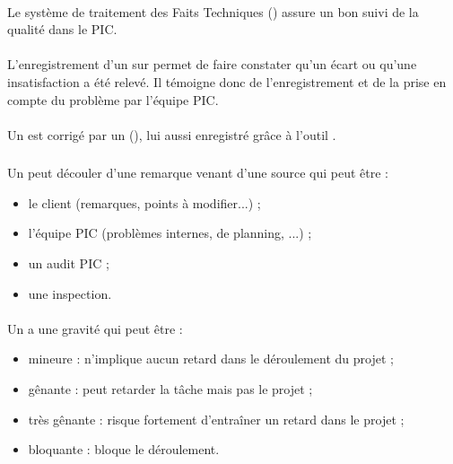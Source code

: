 \paragraph*{} Le système de traitement des Faits Techniques (\FTCourt) assure un bon suivi de la qualité dans
le PIC.

\paragraph*{} L'enregistrement d'un \FT{} sur \lintranet{} permet de faire constater qu'un écart ou
qu'une insatisfaction a été relevé. Il témoigne donc de l'enregistrement et de la prise en compte
du problème par l'équipe PIC.

\paragraph*{} Un \FTCourt{} est corrigé par un \OC{} (\OCCourt), lui aussi enregistré grâce à l'outil
\lintranet .

\subsubsection*{\FT}
\paragraph*{} Un \FT{} peut découler d'une remarque venant d'une source qui peut être :

\begin{itemize}
	\item le client (remarques, points à modifier...) ;
	\item l'équipe PIC (problèmes internes, de planning, ...) ;
	\item un audit PIC ;
	\item une inspection.
\end{itemize}

\paragraph*{} Un \FTCourt{} a une gravité qui peut être :
\begin{itemize}
\item mineure : n'implique aucun retard dans le déroulement du projet ;
\item gênante : peut retarder la tâche mais pas le projet ;
\item très gênante : risque fortement d'entraîner un retard dans le projet ;
\item bloquante : bloque le déroulement.
\end{itemize}

